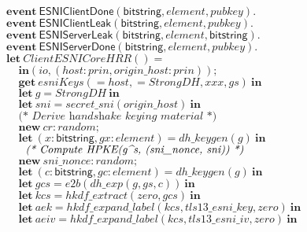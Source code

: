 \documentclass{article}
\theoremstyle{definition}
\newcommand{\kwl}[1]{\mathbf{#1}}
\newcommand{\kwt}[1]{\mathsf{#1}}
\newcommand{\kwe}[1]{\mathsf{#1}}
\newcommand{\var}[1]{\mathit{#1}}
\theoremstyle{definition}
\begin{document}
\begin{tabbing}
$\kwl{event}\ \kwe{ESNIClientDone}(\kwt{bitstring}, \var{element}, \var{pubkey}). $\\
$\kwl{event}\ \kwe{ESNIClientLeak}(\kwt{bitstring}, \var{element}, \var{pubkey}). $\\
$\kwl{event}\ \kwe{ESNIServerLeak}(\kwt{bitstring}, \var{element}, \kwt{bitstring}). $\\
$\kwl{event}\ \kwe{ESNIServerDone}(\kwt{bitstring}, \var{element}, \var{pubkey}). $\\
$ $\\
$\kwl{let}\ \var{ClientESNICoreHRR}() =  $\\
$\ \ \ \ \ \kwl{in}(\var{io}, (\var{host}{:}\var{prin}, \var{origin{\_}host}{:}\var{prin})); $\\
$\ \ \ \ \ \kwl{get}\ \var{esniKeys}( = \var{host},  = \var{StrongDH}, \var{xxx}, \var{gs})\ \kwl{in} $\\
$\ \ \ \ \ \kwl{let}\ \var{g} = \var{StrongDH}\ \kwl{in} $\\
$\ \ \ \ \ \kwl{let}\ \var{sni} = \var{secret{\_}sni}(\var{origin{\_}host})\ \kwl{in} $\\
$ $\\
$\ \ \ \ \ \textit{(* Derive handshake keying material *)} $\\
$\ \ \ \ \ \kwl{new}\ \var{cr}{:}\var{random}; $\\
$\ \ \ \ \ \kwl{let}\ (\var{x}{:}\kwt{bitstring}, \var{gx}{:}\var{element}) = \var{dh{\_}keygen}(\var{g})\ \kwl{in} $\\
$ $\\
$\ \ \ \ \ \textit{(* Compute HPKE(g{\string^}s, (sni{\_}nonce, sni)) *)} $\\
$\ \ \ \ \ \kwl{new}\ \var{sni{\_}nonce}{:}\var{random}; $\\
$\ \ \ \ \ \kwl{let}\ (\var{c}{:}\kwt{bitstring}, \var{gc}{:}\var{element}) = \var{dh{\_}keygen}(\var{g})\ \kwl{in} $\\
$\ \ \ \ \ \kwl{let}\ \var{gcs} = \var{e2b}(\var{dh{\_}exp}(\var{g}, \var{gs}, \var{c}))\ \kwl{in} $\\
$\ \ \ \ \ \kwl{let}\ \var{kcs} = \var{hkdf{\_}extract}(\var{zero}, \var{gcs})\ \kwl{in} $\\
$\ \ \ \ \ \kwl{let}\ \var{aek} = \var{hkdf{\_}expand{\_}label}(\var{kcs}, \var{tls13{\_}esni{\_}key}, \var{zero})\ \kwl{in} $\\
$\ \ \ \ \ \kwl{let}\ \var{aeiv} = \var{hkdf{\_}expand{\_}label}(\var{kcs}, \var{tls13{\_}esni{\_}iv}, \var{zero})\ \kwl{in} $\\

\end{tabbing}
\end{document}
